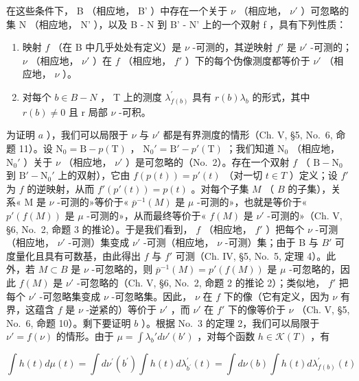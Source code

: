 在这些条件下， B （相应地， B' ）中存在一个关于 \(\nu\) （相应地， \(\nu'\) ）可忽略的集 N （相应地， N' ），以及 B - N 到 B' - N' 上的一个双射 f ，具有下列性质：

\begin{enumerate}
\def\labelenumi{\alph{enumi})}
\item
  映射 \(f\) （在 B 中几乎处处有定义）是 \(\nu\) -可测的，其逆映射 \(f'\) 是 \(\nu'\) -可测的； \(\nu\) （相应地， \(\nu'\) ）在 \(f\) （相应地， \(f'\) ）下的每个伪像测度都等价于 \(\nu'\) （相应地， \(\nu\) ）。
\item
  对每个 \(b \in B - N\) ， T 上的测度 \(\lambda_{f(b)}^{\prime}\) 具有 \(r(b)\lambda_{b}\) 的形式，其中 \(r(b) \neq 0\) 且 r 局部 \(\nu\) -可积。
\end{enumerate}

为证明 \(a\) ），我们可以局限于 \(\nu\) 与 \(\nu'\) 都是有界测度的情形（Ch. V, §5, No.~6, 命题 11）。设 \(\mathrm{N}_0 = \mathrm{B} - p(\mathrm{T})\) ， \(\mathrm{N}_0' = \mathrm{B}' - p'(\mathrm{T})\) ；我们知道 \(\mathrm{N}_0\) （相应地， \(\mathrm{N}_0'\) ）关于 \(\nu\) （相应地， \(\nu'\) ）是可忽略的（No.~2）。存在一个双射 \(f\) （ \(\mathrm{B} - \mathrm{N}_0\) 到 \(\mathrm{B}' - \mathrm{N}_0'\) 上的双射），它由 \(f(p(t)) = p'(t)\) （对一切 \(t \in T\) ）定义；设 \(f'\) 为 \(f\) 的逆映射，从而 \(f'(p'(t)) = p(t)\) 。对每个子集 \(M\) （ \(B\) 的子集），关系« M 是 \(\nu\) -可测的»等价于« \(\overline{p}^{-1}(M)\) 是 \(\mu\) -可测的»，也就是等价于« \(p'(f(M))\) 是 \(\mu\) -可测的»，从而最终等价于« \(f(M)\) 是 \(\nu'\) -可测的»（Ch. V, §6, No.~2, 命题 3 的推论）。于是我们看到， \(f\) （相应地， \(f'\) ）把每个 \(\nu\) -可测（相应地， \(\nu'\) -可测）集变成 \(\nu'\) -可测（相应地， \(\nu\) -可测）集；由于 B 与 \(B'\) 可度量化且具有可数基，由此得出 \(f\) 与 \(f'\) 可测（Ch. IV, §5, No.~5, 定理 4）。此外，若 \(M \subset B\) 是 \(\nu\) -可忽略的，则 \(\overline{p}^{-1}(M) = p'(f(M))\) 是 \(\mu\) -可忽略的，因此 \(f(M)\) 是 \(\nu'\) -可忽略的（Ch. V, §6, No.~2, 命题 2 的推论 2）；类似地， \(f'\) 把每个 \(\nu'\) -可忽略集变成 \(\nu\) -可忽略集。因此， \(\nu\) 在 \(f\) 下的像（它有定义，因为 \(\nu\) 有界，这蕴含 \(f\) 是 \(\nu\) -逆紧的）等价于 \(\nu'\) ，而 \(\nu'\) 在 \(f'\) 下的像等价于 \(\nu\) （Ch. V, §5, No.~6, 命题 10）。剩下要证明 \(b\) ）。根据 No.~3 的定理 2，我们可以局限于 \(\nu' = f(\nu)\) 的情形。由于 \(\mu = \int \lambda_b' d\nu'(b')\) ，对每个函数 \(h \in \mathcal{K}(T)\) ，有

\[
\int h (t) d \mu (t) = \int d \nu^ {\prime} (b ^ {\prime}) \int h (t) d \lambda_ {b ^ {\prime}} ^ {\prime} (t) = \int d \nu (b) \int h (t) d \lambda_ {f (b)} ^ {\prime} (t)
\]


